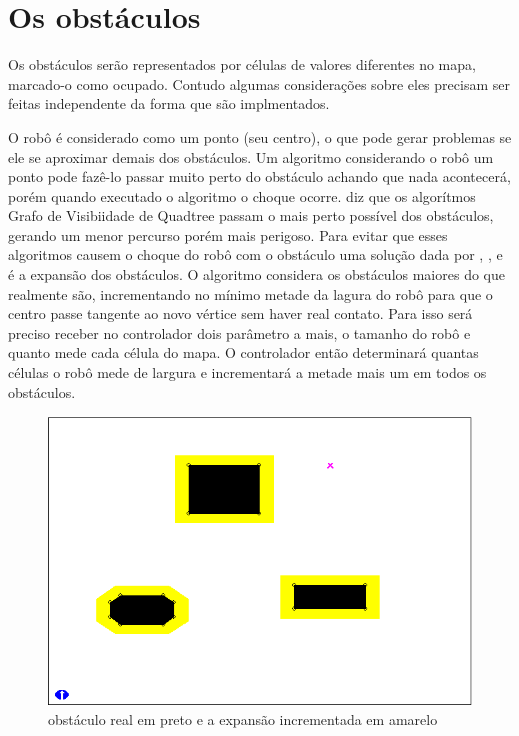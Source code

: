 \section{Os obstáculos}

Os obstáculos serão representados por células de valores diferentes no mapa, marcado-o como ocupado. Contudo algumas considerações sobre eles precisam ser feitas independente da forma que são implmentados.

O robô é considerado como um ponto (seu centro), o que pode gerar problemas se ele se aproximar demais dos obstáculos. Um algoritmo considerando o robô um ponto pode fazê-lo passar muito perto do obstáculo achando que nada acontecerá, porém quando executado o algoritmo o choque ocorre. \cite{Guzman2008} diz que os algorítmos Grafo de Visibiidade de Quadtree passam o mais perto possível dos obstáculos, gerando um menor percurso porém mais perigoso. Para evitar que esses algoritmos causem o choque do robô com o obstáculo uma solução dada por \cite{Souza2008}, \cite{Guzman2008}, \cite{Siegwart2004} e \cite{Thomsen2010} é a expansão dos obstáculos. O algoritmo considera os obstáculos maiores do que realmente são, incrementando no mínimo metade da lagura do robô para que o centro passe tangente ao novo vértice sem haver real contato. Para isso será preciso receber no controlador dois parâmetro a mais, o tamanho do robô e quanto mede cada célula do mapa. O controlador então determinará quantas células o robô mede de largura e incrementará a metade mais um em todos os obstáculos.

\begin{figure}[h]
	\centering
	\label{fig28}
		\includegraphics[keepaspectratio=true,scale=0.5]{figuras/expansao.png}
	\caption{obstáculo real em preto e a expansão incrementada em amarelo \cite{MRIT_SITE}}
\end{figure}

